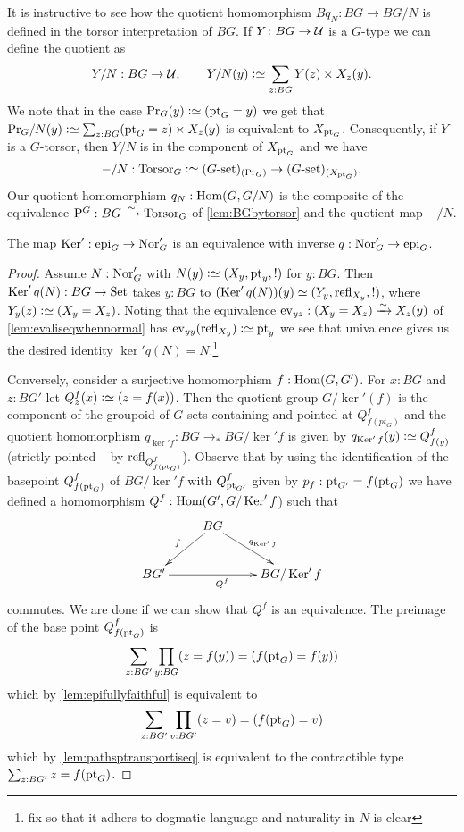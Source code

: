 \begin{remark}
It is instructive to see how the quotient homomorphism $Bq_N:BG\to BG/N$ is defined in the torsor interpretation of $BG$.  If $Y\colon BG\to{\mathcal{U}}$ is a $G$-type we can define the quotient as
$$
Y/N:BG\to\UU,\qquad Y/N(y)\defequi\sum_{z:BG}Y(z)\times X_z(y).
$$
We note that in the case $\princ G(y)\defequi (\pt_G=y)$ we get
that 
$
\princ G /N(y)\defequi\sum_{z:BG}(\pt_G=z)\times X_z(y)
$
is equivalent to $X_{\mathrm{pt}_G}$.  Consequently, if $Y$ is a $G$-torsor, then $Y/N$ is in the component of $X_{\mathrm{pt}_G}$ and we have
$$-/N:\typetorsor_G\defequi (G\text{-set})_{(\princ G)}\to (G\text{-set})_{(X_{\pt_G})}.
$$ Our quotient homomorphism $q_N:\Hom(G,G/N)$ is the composite of the equivalence $\mathrm{P}_{\!}^G:BG\xrightarrow{\sim}\mathrm{Torsor}_G$ of \cref{lem:BGbytorsor} and the quotient map $-/N$.
\end{remark}
\begin{lemma}
  \label{lem:qeq}
  The map $\ker':\epi_G\to\typenormal_G'$ is an equivalence with inverse $q:\mathrm{Nor}_G'\to\mathrm{epi}_G$.
\end{lemma}
\begin{proof}
  Assume $N:\mathrm{Nor}_G'$ with $N(y)\defequi(X_y,\pt_y,!)$ for $y:BG$.  Then $\ker' q(N):BG\to\Set$ takes $y:BG$ to $(\ker' q(N))(y)\oldequiv(Y_y,\refl{X_y},!)$, where $Y_y(z)\defequi (X_y=X_z)$.  Noting that the equivalence $\mathrm{ev}_{yz}:(X_y=X_z)\xrightarrow{\sim} X_z(y)$ of \cref{lem:evaliseqwhennormal} has $\mathrm{ev}_{yy}(\refl{X_y})\defequi \pt_y$ we see that univalence gives us the desired identity $\ker' q(N)=N$.\footnote{fix so that it adhers to dogmatic language and naturality in $N$ is clear}

Conversely, consider a surjective homomorphism $f:\Hom(G,G')$.  
For $x:BG$ and $z:BG'$ let $Q^f_z(x)\defequi (z=f(x))$.  
Then the quotient group $G/\ker'(f)$ is the component  of the groupoid of $G$-sets containing and pointed at $Q^f_{f(pt_G)}$ and the quotient homomorphism $q_{\ker' f}:BG\to_* BG/\ker' f$ is given by  $q_{\ker' f}(y)\defequi Q^f_{f(y)}$ (strictly pointed -- \ie by $\refl{Q^f_{f(\pt_G)}}$). 
Observe that by using the identification of the basepoint $Q^f_{f(\mathrm{pt}_G)}$ of $BG/\ker'f$ with $Q^f_{\mathrm{pt}_{G'}}$ given by $p_f:\mathrm{pt}_{G'}=f(\mathrm{pt}_G)$ we have defined a homomorphism $Q^f:\Hom(G',G/\ker'f$) such that 
 $$\xymatrix{&BG\ar[dl]_f\ar[dr]^{q_{\ker'f}}&\\
 BG'\ar[rr]_{Q^f}&&BG/\ker'f
}$$
commutes.
We are done if we can show that $Q^f$ is an equivalence.
The preimage of the base point $Q^f_{f(\mathrm{pt}_G)}$ is
$$\sum_{z:BG'}\prod_{y:BG}(z=f(y))=(f(\mathrm{pt}_G)=f(y))$$ 
which by 
\cref{lem:epifullyfaithful} is equivalent to
$$\sum_{z:BG'}\prod_{v:BG'}(z=v)=(f(\mathrm{pt}_G)=v)$$
which by \cref{lem:pathsptransportiseq} is equivalent to the contractible type $\sum_{z:BG'}z=f(\mathrm{pt}_G)$.
\end{proof}


